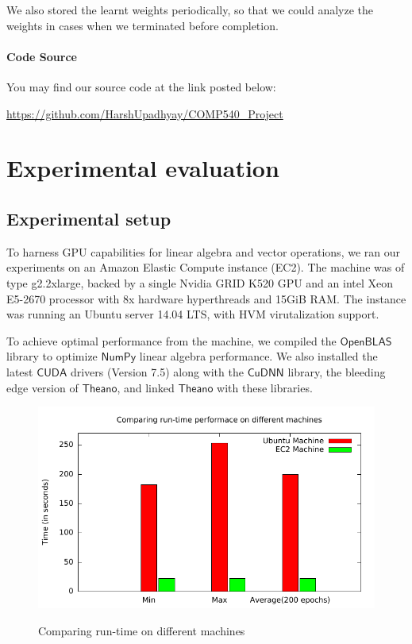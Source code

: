 \documentclass[]{article}
\newcommand*{\numpy}{\ensuremath{\mathsf{NumPy}}}
\begin{document}
We also stored the learnt weights periodically, so that we could analyze the weights in cases when we terminated before completion. 

\paragraph{Code Source}
You may find our source code at the link posted below:

 \url{https://github.com/HarshUpadhyay/COMP540_Project}
\section{Experimental evaluation}

\subsection{Experimental setup}
To harness GPU capabilities for linear algebra and vector operations, we ran our experiments on an Amazon Elastic Compute instance (EC2). The machine was of type  g2.2xlarge, backed by a single Nvidia GRID K520 GPU and an intel Xeon E5-2670 processor with 8x hardware hyperthreads and 15GiB RAM. The instance was running an Ubuntu server 14.04 LTS, with HVM virutalization support.

To achieve optimal performance from the machine, we compiled the $\mathsf{OpenBLAS}$ library to optimize $\numpy$ linear algebra performance. We also installed the latest $\mathsf{CUDA}$ drivers (Version 7.5) along with the $\mathsf{CuDNN}$ library, the bleeding edge version of $\mathsf{Theano}$,  and linked $\mathsf{Theano}$ with these libraries.

\begin{figure}[t]
\centering
\includegraphics[scale=0.8]{Submissionlogs/RunTime.pdf}
\label{Fig:Runtime}
\caption{Comparing run-time on different machines}
\end{figure}
\end{document}
